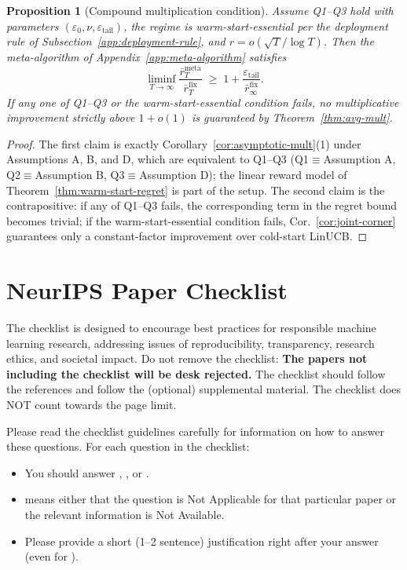 \documentclass{article}
\newtheorem{proposition}{Proposition}
\theoremstyle{definition}
\theoremstyle{remark}
\newcommand{\meta}{\mathrm{meta}}
\newcommand{\fix}{\mathrm{fix}}
\theoremstyle{remark}
\begin{document}
\begin{proposition}[Compound multiplication condition]
\label{prop:compound-multiplication}
Assume Q1--Q3 hold with parameters
$(\varepsilon_0,\nu,\varepsilon_{\mathrm{tail}})$, the regime is
warm-start-essential per the deployment rule of
Subsection~\ref{app:deployment-rule}, and $r=o(\sqrt T/\log T)$. Then
the meta-algorithm of Appendix~\ref{app:meta-algorithm} satisfies
\[
\liminf_{T\to\infty}
\frac{\bar r_T^{\meta}}{\bar r_T^{\fix}}
\;\ge\; 1+\frac{\varepsilon_{\mathrm{tail}}}{\bar r_\infty^{\fix}}.
\]
If \emph{any one} of Q1--Q3 or the warm-start-essential condition
fails, no multiplicative improvement strictly above $1+o(1)$ is
guaranteed by Theorem~\ref{thm:avg-mult}.
\end{proposition}

\begin{proof}
The first claim is exactly Corollary~\ref{cor:asymptotic-mult}(1) under
Assumptions A, B, and D, which are equivalent to Q1--Q3
(Q1$\equiv$Assumption A, Q2$\equiv$Assumption B, Q3$\equiv$Assumption
D); the linear reward model of Theorem~\ref{thm:warm-start-regret} is
part of the setup. The second claim is the contrapositive: if any of
Q1--Q3 fails, the corresponding term in the regret bound becomes
trivial; if the warm-start-essential condition fails, Cor.~\ref{cor:joint-corner}
guarantees only a constant-factor improvement over cold-start LinUCB.
\end{proof}




\section*{NeurIPS Paper Checklist}

The checklist is designed to encourage best practices for responsible machine learning research, addressing issues of reproducibility, transparency, research ethics, and societal impact. Do not remove the checklist: {\bf The papers not including the checklist will be desk rejected.} The checklist should follow the references and follow the (optional) supplemental material.  The checklist does NOT count towards the page
limit. 

Please read the checklist guidelines carefully for information on how to answer these questions. For each question in the checklist:
\begin{itemize}
    \item You should answer \answerYes{}, \answerNo{}, or \answerNA{}.
    \item \answerNA{} means either that the question is Not Applicable for that particular paper or the relevant information is Not Available.
    \item Please provide a short (1--2 sentence) justification right after your answer (even for \answerNA). 
\end{itemize}
\end{document}
